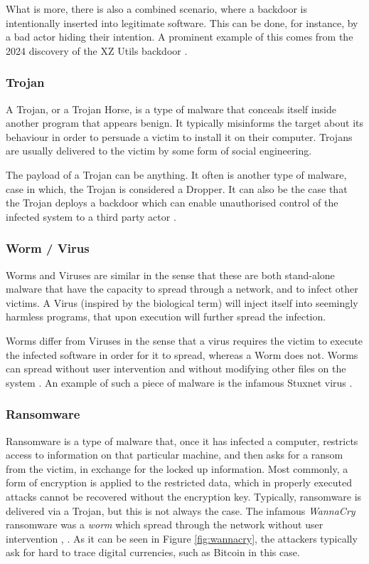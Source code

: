 What is more, there is also a combined scenario, where a backdoor is intentionally inserted into legitimate software. This can be done, for instance, by a bad actor hiding their intention. A prominent example of this comes from the 2024 discovery of the XZ Utils backdoor \cite{xz_backdoor}.

\subsubsection{Trojan}

A Trojan, or a Trojan Horse, is a type of malware that conceals itself inside another program that appears benign. It typically misinforms the target about its behaviour in order to persuade a victim to install it on their computer. Trojans are usually delivered to the victim by some form of social engineering. 

The payload of a Trojan can be anything. It often is another type of malware, case in which, the Trojan is considered a Dropper. It can also be the case that the Trojan deploys a backdoor which can enable unauthorised control of the infected system to a third party actor \cite{wiki_malware}.

\subsubsection{Worm / Virus}

Worms and Viruses are similar in the sense that these are both stand-alone malware that have the capacity to spread through a network, and to infect other victims. A Virus (inspired by the biological term) will inject itself into seemingly harmless programs, that upon execution will further spread the infection. 

Worms differ from Viruses in the sense that a virus requires the victim to execute the infected software in order for it to spread, whereas a Worm does not. Worms can spread without user intervention and without modifying other files on the system \cite{wiki_malware}. An example of such a piece of malware is the infamous Stuxnet virus \cite{stuxnet}.

\subsubsection{Ransomware}

Ransomware is a type of malware that, once it has infected a computer, restricts access to information on that particular machine, and then asks for a ransom from the victim, in exchange for the locked up information. Most commonly, a form of encryption is applied to the restricted data, which in properly executed attacks cannot be recovered without the encryption key. Typically, ransomware is delivered via a Trojan, but this is not always the case. The infamous \emph{WannaCry} ransomware was a \emph{worm} which spread through the network without user intervention \cite{wiki_wannacry}, \cite{wiki_ransomware}. As it can be seen in Figure \ref{fig:wannacry}, the attackers typically ask for hard to trace digital currencies, such as Bitcoin in this case.

